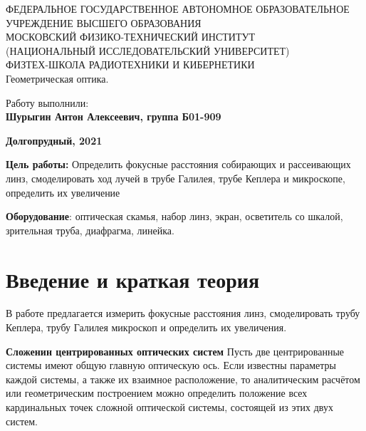 \documentclass[15pt,a5paper,reqno]{article}
\begin{document}
\begin{center}
  {\small ФЕДЕРАЛЬНОЕ ГОСУДАРСТВЕННОЕ АВТОНОМНОЕ ОБРАЗОВАТЕЛЬНОЕ\\ УЧРЕЖДЕНИЕ ВЫСШЕГО ОБРАЗОВАНИЯ\\ МОСКОВСКИЙ ФИЗИКО-ТЕХНИЧЕСКИЙ ИНСТИТУТ\\ (НАЦИОНАЛЬНЫЙ ИССЛЕДОВАТЕЛЬСКИЙ УНИВЕРСИТЕТ)\\ ФИЗТЕХ-ШКОЛА РАДИОТЕХНИКИ И КИБЕРНЕТИКИ}\\
  \hfill \break
  \hfill \break
  \hfill \break
  \Huge{Геометрическая оптика.}\\
\end{center}

\hfill \break
\hfill \break
\hfill \break
\hfill \break
\hfill \break
\hfill \break

\begin{flushright}
  \normalsize{Работу выполнили:}\\
  \normalsize{\textbf{Шурыгин Антон Алексеевич, группа Б01-909}}\\
\end{flushright}

\begin{center}
  \normalsize{\textbf{Долгопрудный, 2021}}
\end{center}


\thispagestyle{empty} %


\newpage
\thispagestyle{plain}
\tableofcontents
\thispagestyle{plain}
\newpage



\textbf{Цель работы:}
Определить фокусные расстояния собирающих и рассеивающих линз, смоделировать ход лучей в трубе Галилея, трубе Кеплера и микроскопе, определить их увеличение

\textbf{Оборудование}: оптическая скамья, набор линз, экран, осветитель со шкалой, 
зрительная труба, диафрагма, линейка.

\section{Введение и краткая теория}

В работе предлагается измерить фокусные расстояния линз, смоделировать трубу Кеплера, трубу Галилея
микроскоп и определить их увеличения.
\newline

\textbf{Сложенин центрированных оптических систем}
Пусть две центрированные системы имеют общую главную оптическую ось. Если известны параметры каждой системы, а также их взаимное расположение, то аналитическим расчётом или геометрическим
построением можно определить положение всех кардинальных точек
сложной оптической системы, состоящей из этих двух систем.
\end{document}
